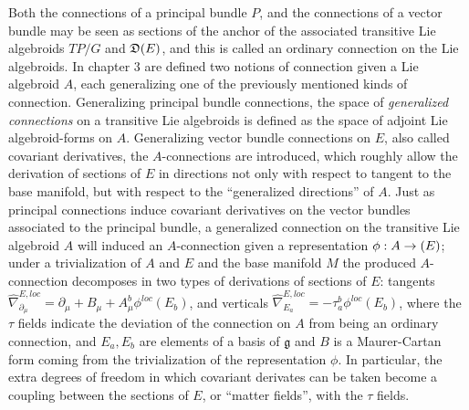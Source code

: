 Both the connections of a principal bundle $P$, and the connections of a vector bundle may be seen as sections of the anchor of the associated transitive Lie algebroids $TP/G$ and $\mathfrak{D}(E)$, and this is called an ordinary connection on the Lie algebroids. In chapter $3$ are defined two notions of connection given a Lie algebroid $A$, each generalizing one of the previously mentioned kinds of connection. Generalizing principal bundle connections, the space of \textit{generalized connections} on a transitive Lie algebroids is defined as the space of adjoint Lie algebroid-forms on $A$. Generalizing vector bundle connections on $E$, also called covariant derivatives, the $A$-connections are introduced, which roughly allow the derivation of sections of $E$ in directions not only with respect to tangent to the base manifold, but with respect to the ``generalized directions'' of $A$. Just as principal connections induce covariant derivatives on the vector bundles associated to the principal bundle, a generalized connection on the transitive Lie algebroid $A$ will induced an $A$-connection given a representation $\phi:A \to \alg(E)$; under a trivialization of $A$ and $E$ and the base manifold $M$ the produced $A$-connection decomposes in two types of derivations of sections of $E$: tangents $\hat \nabla^{E, loc}_{\partial_\mu} = \partial_\mu + B_\mu + A^b_\mu \phi^{loc}(E_b)$, and verticals $\hat \nabla^{E, loc}_{E_a} = - \tau^b_a \phi^{loc} (E_b)$, where the $\tau$ fields indicate the deviation of the connection on $A$ from being an ordinary connection, and $E_a, E_b$ are elements of a basis of $\mathfrak g$ and $B$ is a Maurer-Cartan form coming from the trivialization of the representation $\phi$. In particular, the extra degrees of freedom in which covariant derivates can be taken become a coupling between the sections of $E$, or ``matter fields'', with the $\tau$ fields. 

